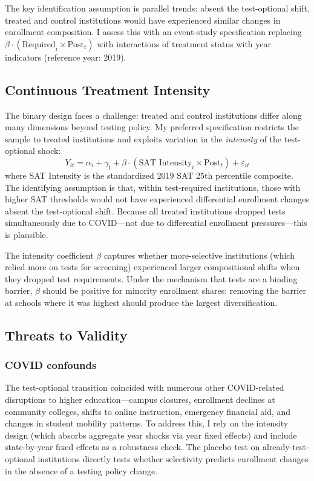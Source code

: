 \documentclass[12pt]{article}
\begin{document}
The key identification assumption is parallel trends: absent the test-optional shift, treated and control institutions would have experienced similar changes in enrollment composition. I assess this with an event-study specification replacing $\beta \cdot (\text{Required}_i \times \text{Post}_t)$ with interactions of treatment status with year indicators (reference year: 2019).

\subsection{Continuous Treatment Intensity}

The binary design faces a challenge: treated and control institutions differ along many dimensions beyond testing policy. My preferred specification restricts the sample to treated institutions and exploits variation in the \textit{intensity} of the test-optional shock:
\begin{equation}
Y_{it} = \alpha_i + \gamma_t + \beta \cdot (\text{SAT Intensity}_i \times \text{Post}_t) + \varepsilon_{it}
\label{eq:intensity}
\end{equation}
where SAT Intensity is the standardized 2019 SAT 25th percentile composite. The identifying assumption is that, within test-required institutions, those with higher SAT thresholds would not have experienced differential enrollment changes absent the test-optional shift. Because all treated institutions dropped tests simultaneously due to COVID---not due to differential enrollment pressures---this is plausible.

The intensity coefficient $\beta$ captures whether more-selective institutions (which relied more on tests for screening) experienced larger compositional shifts when they dropped test requirements. Under the mechanism that tests are a binding barrier, $\beta$ should be positive for minority enrollment shares: removing the barrier at schools where it was highest should produce the largest diversification.

\subsection{Threats to Validity}

\subsubsection*{COVID confounds} The test-optional transition coincided with numerous other COVID-related disruptions to higher education---campus closures, enrollment declines at community colleges, shifts to online instruction, emergency financial aid, and changes in student mobility patterns. To address this, I rely on the intensity design (which absorbs aggregate year shocks via year fixed effects) and include state-by-year fixed effects as a robustness check. The placebo test on already-test-optional institutions directly tests whether selectivity predicts enrollment changes in the absence of a testing policy change.
\end{document}
